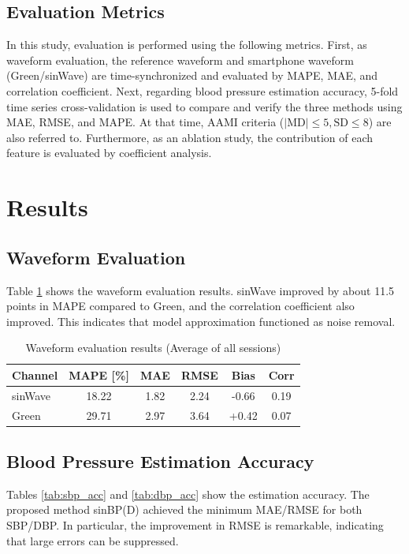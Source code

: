 \documentclass[fleqn,10pt,twocolumn]{AROB}
\begin{document}
\subsection{Evaluation Metrics}
In this study, evaluation is performed using the following metrics. First, as waveform evaluation, the reference waveform and smartphone waveform (Green/sinWave) are time-synchronized and evaluated by MAPE, MAE, and correlation coefficient. Next, regarding blood pressure estimation accuracy, 5-fold time series cross-validation is used to compare and verify the three methods using MAE, RMSE, and MAPE. At that time, AAMI criteria ($|\text{MD}|\leq 5, \text{SD}\leq 8$) are also referred to. Furthermore, as an ablation study, the contribution of each feature is evaluated by coefficient analysis.

\section{Results}
\subsection{Waveform Evaluation}
Table \ref{tab:waveform_eval} shows the waveform evaluation results. sinWave improved by about 11.5 points in MAPE compared to Green, and the correlation coefficient also improved. This indicates that model approximation functioned as noise removal.

\begin{table}[h]
\caption{Waveform evaluation results (Average of all sessions)}
\label{tab:waveform_eval}
\centering
\small
\begin{tabular}{lccccc}
\hline
Channel & MAPE [\%] & MAE & RMSE & Bias & Corr \\
\hline
sinWave & 18.22 & 1.82 & 2.24 & -0.66 & 0.19 \\
Green & 29.71 & 2.97 & 3.64 & +0.42 & 0.07 \\
\hline
\end{tabular}
\end{table}

\subsection{Blood Pressure Estimation Accuracy}
Tables \ref{tab:sbp_acc} and \ref{tab:dbp_acc} show the estimation accuracy. The proposed method sinBP(D) achieved the minimum MAE/RMSE for both SBP/DBP. In particular, the improvement in RMSE is remarkable, indicating that large errors can be suppressed.
\end{document}
